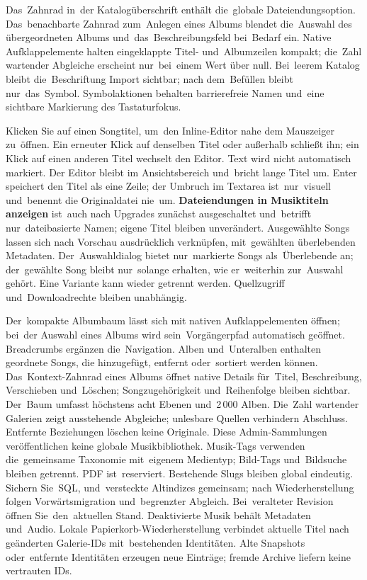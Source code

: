 \documentclass[11pt,a4paper]{article}
\newcommand{\filepath}[1]{\path{#1}}
\newcommand{\ui}[1]{\textbf{#1}}
\begin{document}
Das~Zahnrad in~der Katalogüberschrift enthält die~globale Dateiendungsoption.
Das~benachbarte Zahnrad zum~Anlegen eines Albums blendet die~Auswahl des
übergeordneten Albums und~das~Beschreibungsfeld bei~Bedarf ein. Native
Aufklappelemente halten eingeklappte Titel- und~Albumzeilen kompakt; die~Zahl
wartender Abgleiche erscheint nur~bei~einem Wert über null.
Bei~leerem Katalog bleibt die~Beschriftung Import sichtbar; nach dem~Befüllen
bleibt nur~das~Symbol. Symbolaktionen behalten barrierefreie Namen und~eine
sichtbare Markierung des Tastaturfokus.

Klicken Sie auf einen Songtitel, um~den Inline-Editor nahe dem Mauszeiger
zu~öffnen.
Ein erneuter Klick auf denselben Titel oder außerhalb schließt ihn; ein Klick
auf einen anderen Titel wechselt den Editor. Text wird nicht automatisch
markiert. Der Editor bleibt im Ansichtsbereich und~bricht lange Titel um.
Enter speichert den Titel als eine Zeile; der Umbruch im Textarea
ist~nur~visuell
und~benennt die Originaldatei nie~um.
\ui{Dateiendungen in Musiktiteln anzeigen} ist~auch nach Upgrades zunächst
ausgeschaltet und~betrifft nur~dateibasierte Namen; eigene Titel bleiben
unverändert. Ausgewählte Songs lassen sich nach Vorschau ausdrücklich
verknüpfen, mit~gewählten überlebenden Metadaten. Der~Auswahldialog bietet
nur~markierte Songs als~Überlebende an; der~gewählte Song bleibt nur~solange
erhalten, wie er~weiterhin zur~Auswahl gehört. Eine Variante kann wieder
getrennt werden. Quellzugriff und~Downloadrechte bleiben unabhängig.

Der~kompakte Albumbaum lässt sich mit nativen Aufklappelementen öffnen; bei~der
Auswahl eines Albums wird sein~Vorgängerpfad automatisch geöffnet. Breadcrumbs
ergänzen die~Navigation. Alben und~Unteralben enthalten geordnete Songs, die
hinzugefügt, entfernt oder~sortiert werden können. Das~Kontext-Zahnrad eines
Albums öffnet native Details für~Titel, Beschreibung, Verschieben und~Löschen;
Songzugehörigkeit und~Reihenfolge bleiben sichtbar. Der~Baum umfasst höchstens
acht Ebenen und~2\,000 Alben. Die~Zahl wartender Galerien zeigt ausstehende
Abgleiche; unlesbare Quellen verhindern Abschluss.
Entfernte Beziehungen löschen keine Originale. Diese Admin-Sammlungen
veröffentlichen keine globale Musikbibliothek. Musik-Tags verwenden
die~gemeinsame Taxonomie mit~eigenem Medientyp; Bild-Tags und~Bildsuche
bleiben getrennt. PDF ist~reserviert. Bestehende Slugs bleiben global
eindeutig. Sichern Sie~SQL, \filepath{data/music/} und~versteckte Altindizes
gemeinsam; nach Wiederherstellung folgen Vorwärtsmigration und~begrenzter
Abgleich. Bei~veralteter Revision
öffnen Sie~den~aktuellen Stand. Deaktivierte Musik behält Metadaten und~Audio.
Lokale Papierkorb-Wiederherstellung verbindet aktuelle Titel nach geänderten
Galerie-IDs mit~bestehenden Identitäten. Alte Snapshots oder~entfernte
Identitäten erzeugen neue Einträge; fremde Archive liefern keine vertrauten IDs.
\end{document}

